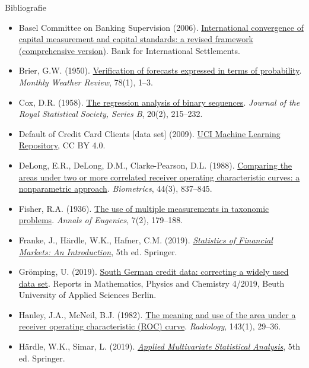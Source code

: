 \begin{frame}{Bibliografie}
\itemsize{\tiny}
\begin{itemize}
    \item Basel Committee on Banking Supervision (2006). \href{https://www.bis.org/publ/bcbs128.htm}{International convergence of capital measurement and capital standards: a revised framework (comprehensive version)}. Bank for International Settlements.
    \item Brier, G.W. (1950). \href{https://doi.org/10.1175/1520-0493(1950)078<0001:VOFEIT>2.0.CO;2}{Verification of forecasts expressed in terms of probability}. \textit{Monthly Weather Review}, 78(1), 1--3.
    \item Cox, D.R. (1958). \href{https://doi.org/10.1111/j.2517-6161.1958.tb00292.x}{The regression analysis of binary sequences}. \textit{Journal of the Royal Statistical Society, Series B}, 20(2), 215--232.
    \item Default of Credit Card Clients [data set] (2009). \href{https://doi.org/10.24432/C55S3H}{UCI Machine Learning Repository}, CC BY 4.0.
    \item DeLong, E.R., DeLong, D.M., Clarke-Pearson, D.L. (1988). \href{https://doi.org/10.2307/2531595}{Comparing the areas under two or more correlated receiver operating characteristic curves: a nonparametric approach}. \textit{Biometrics}, 44(3), 837--845.
    \item Fisher, R.A. (1936). \href{https://doi.org/10.1111/j.1469-1809.1936.tb02137.x}{The use of multiple measurements in taxonomic problems}. \textit{Annals of Eugenics}, 7(2), 179--188.
    \item Franke, J., Härdle, W.K., Hafner, C.M. (2019). \href{https://doi.org/10.1007/978-3-030-13751-9}{\textit{Statistics of Financial Markets: An Introduction}}, 5th ed. Springer.
    \item Grömping, U. (2019). \href{http://www1.beuth-hochschule.de/FB_II/reports/Report-2019-004.pdf}{South German credit data: correcting a widely used data set}. Reports in Mathematics, Physics and Chemistry 4/2019, Beuth University of Applied Sciences Berlin.
    \item Hanley, J.A., McNeil, B.J. (1982). \href{https://doi.org/10.1148/radiology.143.1.7063747}{The meaning and use of the area under a receiver operating characteristic (ROC) curve}. \textit{Radiology}, 143(1), 29--36.
    \item Härdle, W.K., Simar, L. (2019). \href{https://doi.org/10.1007/978-3-030-26006-4}{\textit{Applied Multivariate Statistical Analysis}}, 5th ed. Springer.

\end{itemize}
\end{frame}
